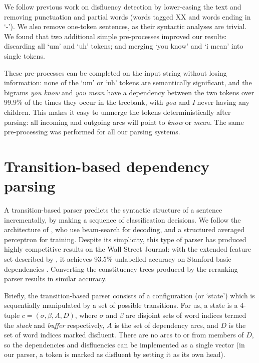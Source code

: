 \documentclass[11pt,letterpaper]{article}
\begin{document}
We follow previous work on disfluency detection by lower-casing the text and
removing punctuation and partial words (words tagged XX and words ending in
`-').  We also remove one-token sentences, as their syntactic
analyses are trivial.
We found that two additional simple pre-processes improved our results: discarding
all `um' and `uh' tokens; and merging `you know' and `i mean' into single tokens.

These pre-processes can be completed on the input string without losing information:
none of the `um' or `uh' tokens are semantically significant, and
the bigrams \emph{you know} and \emph{you mean} have a dependency between the two
tokens over 99.9\% of the times they occur in the treebank, with \emph{you} and \emph{I}
never having any children. This makes it easy to unmerge the tokens deterministically
after parsing:
all incoming and outgoing arcs will point to \emph{know} or \emph{mean}.
The same pre-processing was performed for all our parsing systems.

\section{Transition-based dependency parsing}

A transition-based parser predicts the syntactic structure of a sentence incrementally,
by making a sequence of classification decisions.  We follow the architecture of
\citet{zhang:cl11}, who use beam-search for decoding, and a structured averaged
perceptron for training.  Despite its simplicity, this type of parser
has produced highly competitive results on the Wall Street Journal: with the
extended feature set described by \citet{zhang:11}, it achieves 93.5\%
unlabelled accuracy on Stanford basic dependencies \citep{stanford_deps}.  Converting
the constituency trees produced by the \citet{Charniak05a} reranking parser
results in similar accuracy.

Briefly, the transition-based parser consists of a configuration (or `state') which
is sequentially manipulated by a set of possible transitions. For us, a state is a 4-tuple
$c = (\sigma, \beta, A, D)$, where $\sigma$ and $\beta$ are disjoint sets of word
indices termed the \emph{stack} and \emph{buffer} respectively, $A$ is the set of
dependency arcs, and $D$ is the set of word indices marked disfluent.  There are no
arcs to or from members of $D$, so the dependencies and disfluencies can be
implemented as a single vector (in our parser, a token is marked as disfluent
by setting it as its own head).
\end{document}
